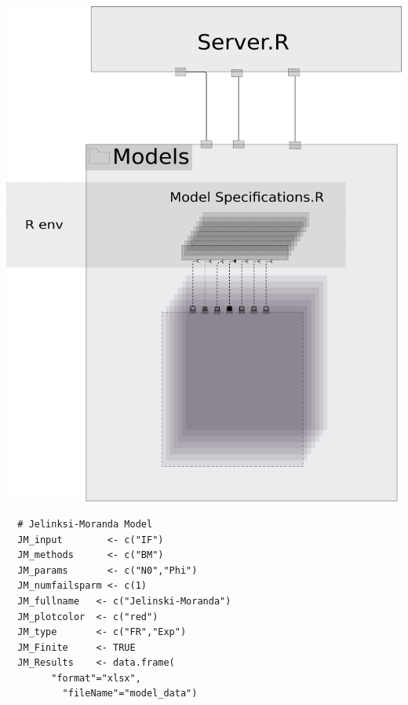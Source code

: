 \documentclass[journal]{IEEEtran}
\begin{document}
\includegraphics[scale=0.35]{ModelSpecifications.png}
\begin{verbatim}
  # Jelinksi-Moranda Model
  JM_input        <- c("IF")
  JM_methods      <- c("BM")
  JM_params       <- c("N0","Phi")
  JM_numfailsparm <- c(1)
  JM_fullname   <- c("Jelinski-Moranda")
  JM_plotcolor  <- c("red")
  JM_type       <- c("FR","Exp")
  JM_Finite     <- TRUE
  JM_Results    <- data.frame(
  		"format"="xlsx",
		  "fileName"="model_data")
\end{verbatim}
\end{document}
